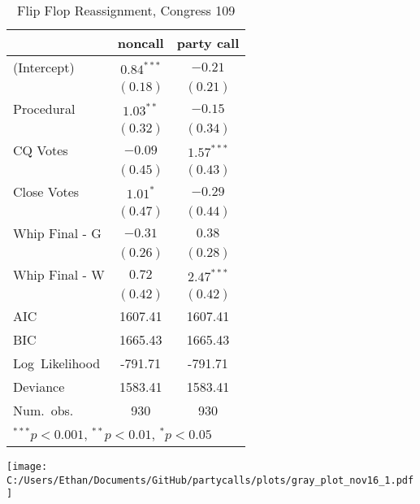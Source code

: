\documentclass[12pt]{article}
\begin{document}
\begin{table}
	\begin{center}
		\begin{tabular}{l c c }
			\hline
			& noncall & party call \\
			\hline
			(Intercept)      & $0.84^{***}$ & $-0.21$      \\
			& $(0.18)$     & $(0.21)$     \\
			Procedural       & $1.03^{**}$  & $-0.15$      \\
			& $(0.32)$     & $(0.34)$     \\
			CQ Votes    & $-0.09$      & $1.57^{***}$ \\
			& $(0.45)$     & $(0.43)$     \\
			Close Votes & $1.01^{*}$   & $-0.29$      \\
			& $(0.47)$     & $(0.44)$     \\
			Whip Final - G     & $-0.31$      & $0.38$       \\
			& $(0.26)$     & $(0.28)$     \\
			Whip Final - W     & $0.72$       & $2.47^{***}$ \\
			& $(0.42)$     & $(0.42)$     \\
			\hline
			AIC              & 1607.41      & 1607.41      \\
			BIC              & 1665.43      & 1665.43      \\
			Log\ Likelihood  & -791.71      & -791.71      \\
			Deviance         & 1583.41      & 1583.41      \\
			Num.\ obs.       & 930          & 930          \\
			\hline
			\multicolumn{3}{l}{\scriptsize{$^{***}p<0.001$, $^{**}p<0.01$, $^*p<0.05$}}
		\end{tabular}
		\caption{Flip Flop Reassignment, Congress 109}
	\end{center}
\end{table}


\begin{center}
	
	\texttt{[image: C:/Users/Ethan/Documents/GitHub/partycalls/plots/gray\_plot\_nov16\_1.pdf]}
	
\end{center}
\end{document}
